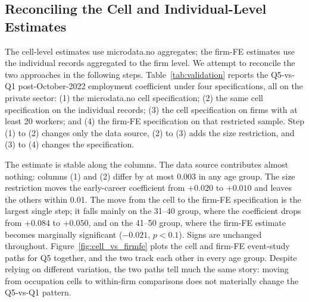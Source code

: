 \documentclass[12pt]{article}
\begin{document}
\subsection{Reconciling the Cell and Individual-Level Estimates}\label{sec:results:reconcile}

The cell-level estimates use microdata.no aggregates; the firm-FE estimates use the individual records aggregated to the firm level. We attempt to reconcile the two approaches in the following steps. Table~\ref{tab:validation} reports the Q5-vs-Q1 post-October-2022 employment coefficient under four specifications, all on the private sector: (1) the microdata.no cell specification; (2) the same cell specification on the individual records; (3) the cell specification on firms with at least 20 workers; and (4) the firm-FE specification on that restricted sample. Step (1) to (2) changes only the data source, (2) to (3) adds the size restriction, and (3) to (4) changes the specification.

The estimate is stable along the columns. The data source contributes almost nothing: columns (1) and (2) differ by at most 0.003 in any age group. The size restriction moves the early-career coefficient from $+0.020$ to $+0.010$ and leaves the others within 0.01. The move from the cell to the firm-FE specification is the largest single step; it falls mainly on the 31--40 group, where the coefficient drops from $+0.084$ to $+0.050$, and on the 41--50 group, where the firm-FE estimate becomes marginally significant ($-0.021$, $p<0.1$). Signs are unchanged throughout. Figure~\ref{fig:cell_vs_firmfe} plots the cell and firm-FE event-study paths for Q5 together, and the two track each other in every age group. Despite relying on different variation, the two paths tell much the same story: moving from occupation cells to within-firm comparisons does not materially change the Q5-vs-Q1 pattern.
\end{document}
